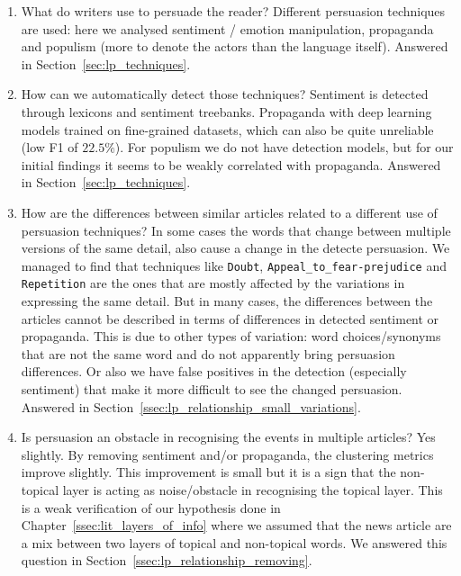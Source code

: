\begin{enumerate}
    \item What do writers use to persuade the reader? Different persuasion techniques are used: here we analysed sentiment / emotion manipulation, propaganda and populism (more to denote the actors than the language itself). Answered in Section~\ref{sec:lp_techniques}.
    \item How can we automatically detect those techniques? Sentiment is detected through lexicons and sentiment treebanks. Propaganda with deep learning models trained on fine-grained datasets, which can also be quite unreliable (low F1 of $22.5\%$). For populism we do not have detection models, but for our initial findings it seems to be weakly correlated with propaganda. Answered in Section~\ref{sec:lp_techniques}.
    \item How are the differences between similar articles related to a different use of persuasion techniques? In some cases the words that change between multiple versions of the same detail, also cause a change in the detecte persuasion. We managed to find that techniques like \texttt{Doubt}, \texttt{Appeal\_to\_fear-prejudice} and \texttt{Repetition} are the ones that are mostly affected by the variations in expressing the same detail. But in many cases, the differences between the articles cannot be described in terms of differences in detected sentiment or propaganda. This is due to other types of variation: word choices/synonyms that are not the same word and do not apparently bring persuasion differences. Or also we have false positives in the detection (especially sentiment) that make it more difficult to see the changed persuasion. Answered in Section~\ref{ssec:lp_relationship_small_variations}.
    \item Is persuasion an obstacle in recognising the events in multiple articles? Yes slightly. By removing sentiment and/or propaganda, the clustering metrics improve slightly. This improvement is small but it is a sign that the non-topical layer is acting as noise/obstacle in recognising the topical layer. This is a weak verification of our hypothesis done in Chapter~\ref{ssec:lit_layers_of_info} where we assumed that the news article are a mix between two layers of topical and non-topical words.  We answered this question in Section~\ref{ssec:lp_relationship_removing}.
\end{enumerate}



